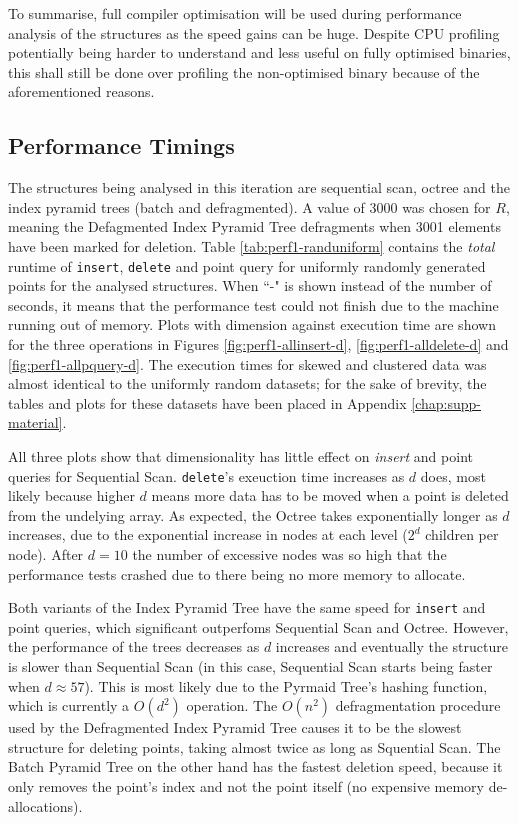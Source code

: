 To summarise, full compiler optimisation will be used during performance analysis of the structures as the speed gains can be huge. Despite CPU profiling potentially being harder to understand and less useful on fully optimised binaries, this shall still be done over profiling the non-optimised binary because of the aforementioned reasons.

\subsection{Performance Timings}

The structures being analysed in this iteration are sequential scan, octree and the index pyramid trees (batch and defragmented). A value of 3000 was chosen for $R$, meaning the Defagmented Index Pyramid Tree defragments when 3001 elements have been marked for deletion. Table \ref{tab:perf1-randuniform} contains the \textit{total} runtime of \texttt{insert}, \texttt{delete} and point query for uniformly randomly generated points for the analysed structures. When ``-" is shown instead of the number of seconds, it means that the performance test could not finish due to the machine running out of memory. Plots with dimension against execution time are shown for the three operations in Figures \ref{fig:perf1-allinsert-d}, \ref{fig:perf1-alldelete-d} and \ref{fig:perf1-allpquery-d}. The execution times for skewed and clustered data was almost identical to the uniformly random datasets; for the sake of brevity, the tables and plots for these datasets have been placed in Appendix \ref{chap:supp-material}. 

All three plots show that dimensionality has little effect on \textit{insert} and point queries for Sequential Scan. \texttt{delete}'s exeuction time increases as $d$ does, most likely because higher $d$ means more data has to be moved when a point is deleted from the undelying array. As expected, the Octree takes exponentially longer as $d$ increases, due to the exponential increase in nodes at each level ($2^d$ children per node). After $d = 10$ the number of excessive nodes was so high that the performance tests crashed due to there being no more memory to allocate.

Both variants of the Index Pyramid Tree have the same speed for \texttt{insert} and point queries, which significant outperfoms Sequential Scan and Octree. However, the performance of the trees decreases as $d$ increases and eventually the structure is slower than Sequential Scan (in this case, Sequential Scan starts being faster when $d \approx 57$). This is most likely due to the Pyrmaid Tree's hashing function, which is currently a $O(d^2)$ operation. The $O(n^2)$ defragmentation procedure used by the Defragmented Index Pyramid Tree causes it to be the slowest structure for deleting points, taking almost twice as long as Squential Scan. The Batch Pyramid Tree on the other hand has the fastest deletion speed, because it only removes the point's index and not the point itself (no expensive memory de-allocations).

